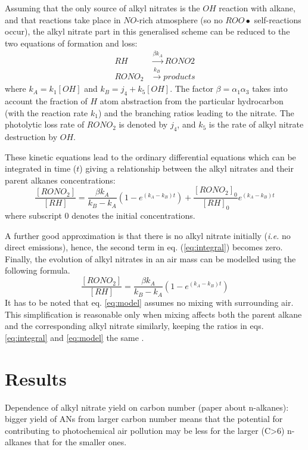 \documentclass[11pt,a4paper]{article}
\begin{document}
Assuming that the only source of alkyl nitrates is the $OH$ reaction with alkane, and that reactions take place in $NO$-rich atmosphere (so no $ROO\bullet$ self-reactions occur), the alkyl nitrate part in this generalised scheme can be reduced to the two equations of formation and loss:
\begin{subequations} \label{eq:an_form_loss0}
\begin{align}
RH &\xrightarrow{\beta k_A} RONO2 \label{eq:an_form_loss1}\\
RONO_2 &\xrightarrow{k_B} \mathit{products} \label{eq:an_form_loss2}
\end{align}
\end{subequations}
where $k_A = k_1[OH]$ and $k_B=j_4 + k_5[OH]$. The factor $\beta=\alpha_1\alpha_3$ takes into account the fraction of $H$ atom abstraction from the particular hydrocarbon (with the reaction rate $k_1$) and the branching ratios leading to the nitrate. The photolytic loss rate of $RONO_2$ is denoted by $j_4$, and $k_5$ is the rate of alkyl nitrate destruction by $OH$.

These kinetic equations lead to the ordinary differential equations which can be integrated in time ($t$) giving a relationship between the alkyl nitrates and their parent alkanes concentrations:
\begin{equation} \label{eq:integral}
\frac{[RONO_2]}{[RH]} = \frac{\beta k_A}{k_B - k_A}\left(1-e^{(k_A - k_B)t}\right)+\frac{[RONO_2]_0}{[RH]_0}e^{(k_A - k_B)t}
\end{equation}
where subscript $0$ denotes the initial concentrations.

A further good approximation is that there is no alkyl nitrate initially (\textit{i.e.} no direct emissions), hence, the second term in eq. (\eqref{eq:integral}) becomes zero. Finally, the evolution of alkyl nitrates in an air mass can be modelled using the following formula.
\begin{equation} \label{eq:model}
\frac{[RONO_2]}{[RH]} = \frac{\beta k_A}{k_B - k_A}\left(1-e^{(k_A - k_B)t}\right)
\end{equation}
It has to be noted that eq. \eqref{eq:model} assumes no mixing with surrounding air. This simplification is reasonable only when mixing affects both the parent alkane and the corresponding alkyl nitrate similarly, keeping the ratios in eqs. \eqref{eq:integral} and \eqref{eq:model} the same \citep{Reeves2007}.

\section{Results} \label{sec:res}
Dependence of alkyl nitrate yield on carbon number (paper about n-alkanes): bigger yield of ANs from larger carbon number means that the potential for contributing to photochemical air pollution may be less for the larger (C>6) n-alkanes that for the smaller ones.
\end{document}
